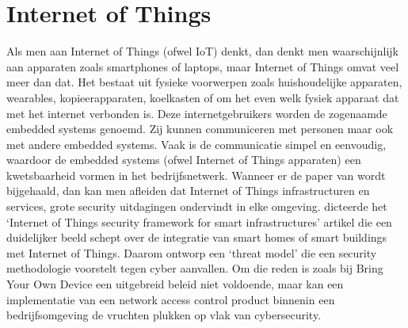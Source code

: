 \section{Internet of Things}
Als men aan Internet of Things (ofwel IoT) denkt, dan denkt men waarschijnlijk aan apparaten zoals smartphones of laptops, maar Internet of Things omvat veel meer dan dat. Het bestaat uit fysieke voorwerpen zoals huishoudelijke apparaten, wearables, kopieerapparaten, koelkasten of om het even welk fysiek apparaat dat met het internet verbonden is.
\newline
\newline 
Deze internetgebruikers worden de zogenaamde embedded systems genoemd. Zij kunnen communiceren met personen maar ook met andere embedded systems. Vaak is de communicatie simpel en eenvoudig, waardoor de embedded systems (ofwel Internet of Things apparaten) een kwetsbaarheid vormen in het bedrijfsnetwerk.
\newline
\newline
Wanneer er de paper van \cite{Salim2016} wordt bijgehaald, dan kan men afleiden dat Internet of Things infrastructuren en services, grote security uitdagingen ondervindt in elke omgeving. \cite{Salim2016} dicteerde het ‘Internet of Things security framework for smart infrastructures’ artikel die een duidelijker beeld schept over de integratie van smart homes of smart buildings met Internet of Things. Daarom ontworp \cite{Salim2016} een ‘threat model’ die een security methodologie voorstelt tegen cyber aanvallen. 
\newline
\newline
Om die reden is zoals bij Bring Your Own Device een uitgebreid beleid niet voldoende, maar kan een implementatie van een network access control product binnenin een bedrijfsomgeving de vruchten plukken op vlak van cybersecurity.  

